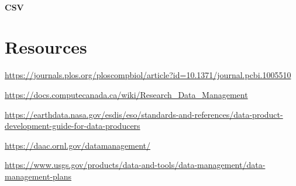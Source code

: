\documentclass[
]{book}
\begin{document}
\hypertarget{csv}{%
\subsubsection{CSV}\label{csv}}

\hypertarget{resources}{%
\chapter{Resources}\label{resources}}

\url{https://journals.plos.org/ploscompbiol/article?id=10.1371/journal.pcbi.1005510}

\url{https://docs.computecanada.ca/wiki/Research_Data_Management}

\url{https://earthdata.nasa.gov/esdis/eso/standards-and-references/data-product-development-guide-for-data-producers}

\url{https://daac.ornl.gov/datamanagement/}

\url{https://www.usgs.gov/products/data-and-tools/data-management/data-management-plans}

  
\end{document}
